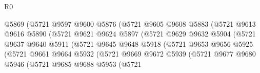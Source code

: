 \begin{lexlean}{R0}
\begin{coremodule}
                                  @5869
                                  (@5721
                                    @9597
                                    @9600
                                    @5876
                                    (@5721
                                      @9605
                                      @9608
                                      @5883
                                      (@5721
                                        @9613
                                        @9616
                                        @5890
                                        (@5721
                                          @9621
                                          @9624
                                          @5897
                                          (@5721
                                            @9629
                                            @9632
                                            @5904
                                            (@5721
                                              @9637
                                              @9640
                                              @5911
                                              (@5721
                                                @9645
                                                @9648
                                                @5918
                                                (@5721
                                                  @9653
                                                  @9656
                                                  @5925
                                                  (@5721
                                                    @9661
                                                    @9664
                                                    @5932
                                                    (@5721
                                                      @9669
                                                      @9672
                                                      @5939
                                                      (@5721
                                                        @9677
                                                        @9680
                                                        @5946
                                                        (@5721
                                                          @9685
                                                          @9688
                                                          @5953
                                                          (@5721

\end{coremodule}
\end{lexlean}
